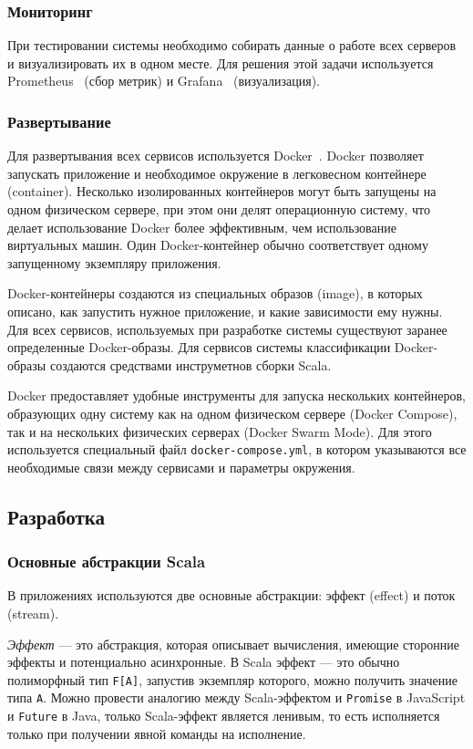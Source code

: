 \documentclass[14pt]{article}
\begin{document}
\subsubsection{Мониторинг}
При тестировании системы необходимо собирать данные о работе всех серверов и визуализировать их в одном месте. Для решения этой задачи используется Prometheus~\cite{prometheus} (сбор метрик) и Grafana~\cite{grafana} (визуализация).

\subsubsection{Развертывание}
Для развертывания всех сервисов используется Docker~\cite{docker}. Docker позволяет запускать приложение и необходимое окружение в легковесном контейнере (container). Несколько изолированных контейнеров могут быть запущены на одном физическом сервере, при этом они делят операционную систему, что делает использование Docker более эффективным, чем использование виртуальных машин. Один Docker-контейнер обычно соответствует одному запущенному экземпляру приложения.

Docker-контейнеры создаются из специальных образов (image), в которых описано, как запустить нужное приложение, и какие зависимости ему нужны. Для всех сервисов, используемых при разработке системы существуют заранее определенные Docker-образы. Для сервисов системы классификации Docker-образы создаются средствами инструметнов сборки Scala.

Docker предоставляет удобные инструменты для запуска нескольких контейнеров, образующих одну систему как на одном физическом сервере (Docker Compose), так и на нескольких физических серверах (Docker Swarm Mode). Для этого используется специальный файл \verb|docker-compose.yml|, в котором указываются все необходимые связи между сервисами и параметры окружения.

\subsection{Разработка}
\subsubsection{Основные абстракции Scala}
\label{section:scalaAbstractions}
В приложениях используются две основные абстракции: эффект (effect) и поток (stream).

\emph{Эффект} --- это абстракция, которая описывает вычисления, имеющие сторонние эффекты и потенциально асинхронные. В Scala эффект --- это обычно полиморфный тип \verb|F[A]|, запустив экземпляр которого, можно получить значение типа \verb|A|. Можно провести аналогию между Scala-эффектом и \verb|Promise| в JavaScript и \verb|Future| в Java, только Scala-эффект является ленивым, то есть исполняется только при получении явной команды на исполнение.
\end{document}
